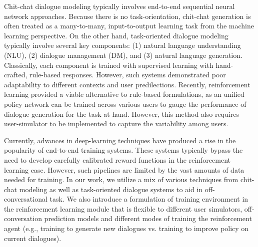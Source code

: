 
Chit-chat dialogue modeling typically involves end-to-end sequential neural network approaches. 
Because there is no task-orientation, chit-chat generation is often treated as a many-to-many, 
input-to-output learning task from the machine learning perspective. 
On the other hand, task-oriented dialogue modeling typically involve several key components: 
(1) natural language understanding (NLU), (2) dialogue management (DM), and 
(3) natural language generation. 
Classically, each component is trained with supervised learning with hand-crafted, rule-based responses. 
However, such systems demonstrated poor adaptability to different contexts and user predilections. 
Recently, reinforcement learning provided a viable alternative to rule-based formulations, 
as an unified policy network can be trained across various users to gauge the performance of dialogue 
generation for the task at hand. 
However, this method also requires user-simulator to be implemented to capture the variability among users.


Currently, advances in deep-learning techniques have produced a rise in the popularity of end-to-end training systems.
These systems typically bypass the need to develop carefully calibrated reward functions in the reinforcement learning case. 
However, such pipelines are limited by the vast amounts of data needed for training. 
In our work, we utilize a mix of various techniques from chit-chat modeling 
as well as task-oriented dialogue systems to aid in off-conversational task. 
We also introduce a formulation of training environment in the 
reinforcement learning module that is flexible to different user simulators, 
off-conversation prediction models and different modes of training the reinforcement agent 
(e.g., training to generate new dialogues vs. training to improve policy on current dialogues).

